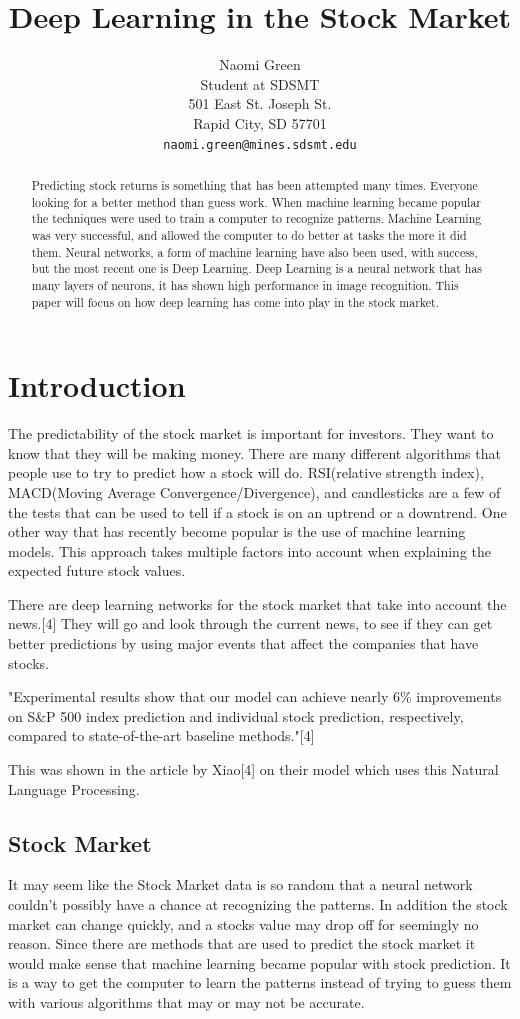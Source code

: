 \documentclass{article}
\title{Deep Learning in the Stock Market}
\author{
  Naomi Green\\
  Student at SDSMT\\
  501 East St. Joseph St. \\
  Rapid City, SD 57701 \\
  \texttt{naomi.green@mines.sdsmt.edu} \\
}
\begin{document}
\maketitle

\begin{abstract}
Predicting stock returns is something that has been attempted many times.
Everyone looking for a better method than guess work.
When machine learning became popular the techniques were used to train a computer to recognize patterns.
Machine Learning was very successful, and allowed the computer to do better at tasks the more it did them.
Neural networks, a form of machine learning have also been used, with success, but the most recent one is Deep Learning. 
Deep Learning is a neural network that has many layers of neurons, it has shown high performance in image recognition. 
This paper will focus on how deep learning has come into play in the stock market.
\end{abstract}

\section{Introduction}
The predictability of the stock market is important for investors.
They want to know that they will be making money.
There are many different algorithms that people use to try to predict how a stock will do. 
RSI(relative strength index), MACD(Moving Average Convergence/Divergence), and candlesticks are a few of the tests that can be used to tell if a stock is on an uptrend or a downtrend. 
One other way that has recently become popular is the use of machine learning models. 
This approach takes multiple factors into account when explaining the expected future stock values.

There are deep learning networks for the stock market that take into account the news.[4]
They will go and look through the current news, to see if they can get better predictions by using major events that affect the companies that have stocks.

"Experimental results show that our model can achieve nearly 6\% improvements on S\&P 500 index prediction and individual stock prediction, respectively, compared to state-of-the-art baseline methods."[4]

This was shown in the article by Xiao[4] on their model which uses this Natural Language Processing.


\subsection{Stock Market}
It may seem like the Stock Market data is so random that a neural network couldn't possibly have a chance at recognizing the patterns. 
In addition the stock market can change quickly, and a stocks value may drop off for seemingly no reason.
Since there are methods that are used to predict the stock market it would make sense that machine learning became popular with stock prediction.
It is a way to get the computer to learn the patterns instead of trying to guess them with various algorithms that may or may not be accurate.
\end{document}
